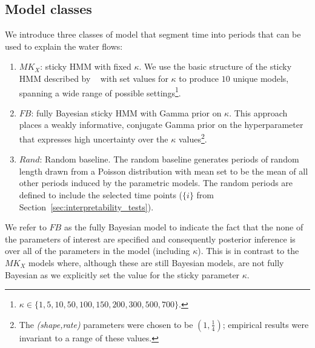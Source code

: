 \documentclass[letterpaper]{article} %
\newcommand{\citename}[1]{\citeauthor{#1}~\shortcite{#1}}
\begin{document}

\subsection{Model classes}
We introduce three classes of model that segment time into periods that can be used to explain the water flows:

\begin{enumerate}
    \item  {${MK_X}$: sticky HMM with fixed $\kappa$.} We use the basic structure of the sticky HMM described by \citename{fox2008hdp} with set values for $\kappa$ to produce $10$ unique models, spanning a wide range of possible settings\footnote{$\kappa \in \{1, 5, 10, 50, 100, 150, 200, 300, 500, 700\}$.}.
    \item  {${FB}$: fully Bayesian sticky HMM with Gamma prior on $\kappa$.} This  approach places a weakly informative, conjugate Gamma prior on the hyperparameter that expresses high uncertainty over the $\kappa$ values\footnote{The \textit{(shape,rate)} parameters were chosen to be $(1,\frac{1}{4})$; empirical results were invariant to a range of these values.}.
    \item  {${Rand}$: Random baseline.} The random baseline generates periods of random length drawn from a Poisson distribution with mean set to be the mean of all other periods induced by the parametric models. The random periods are defined to include the selected time points ($\{i\}$ from Section~\ref{sec:interpretability_tests}).
\end{enumerate}

\noindent We refer to ${FB}$ as the fully Bayesian model to indicate the fact that the none of the parameters of interest are specified and consequently posterior inference is over all of the parameters in the model (including $\kappa$). This is in contrast to the ${MK_X}$ models where, although these are still Bayesian models, are not fully Bayesian as we explicitly set the value for the sticky parameter $\kappa$.
\end{document}
